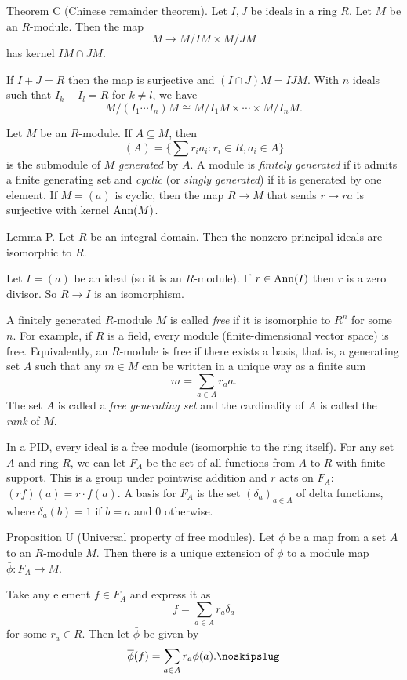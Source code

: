 \parenproclaim Theorem C (Chinese remainder theorem). Let $I,J$ be ideals in a ring $R$. Let $M$ be an $R$-module. Then the map
$$M\to M/IM \times M/JM$$
has kernel $IM\cap JM$.\slug

If $I+J = R$ then the map is surjective and $(I\cap J)M = IJM$. With $n$ ideals such that $I_k + I_l = R$ for $k\neq l$, we have
$$M/(I_1\cdots I_n)M \cong M/I_1M \times \cdots \times M/I_nM.$$

Let $M$ be an $R$-module. If $A\subseteq M$, then
$$(A) = \Big\{\sum r_ia_i : r_i\in R, a_i \in A\Big\}$$
is the submodule of $M$ {\it generated} by $A$. A module is {\it finitely generated} if it admits a finite generating set and {\it cyclic} (or {\it singly generated}) if it is generated by one element. If $M = (a)$ is cyclic, then the map $R\to M$ that sends $r\mapsto ra$ is surjective with kernel $\mathop {\rm Ann}(M)$.

\proclaim Lemma P. Let $R$ be an integral domain. Then the nonzero principal ideals are isomorphic to $R$.

\proof Let $I = (a)$ be an ideal (so it is an $R$-module). If $r\in \mathop {\rm Ann}(I)$ then $r$ is a zero divisor. So $R\to I$ is an isomorphism.\slug

A finitely generated $R$-module $M$ is called {\it free} if it is isomorphic to $R^n$ for some $n$. For example, if $R$ is a field, every module (finite-dimensional vector space) is free. Equivalently, an $R$-module is free if there exists a basis, that is, a generating set $A$ such that any $m\in M$ can be written in a unique way as a finite sum
$$m = \sum_{a\in A} r_a a.$$
The set $A$ is called a {\it free generating set} and the cardinality of $A$ is called the {\it rank} of $M$.

In a PID, every ideal is a free module (isomorphic to the ring itself). For any set $A$ and ring $R$, we can let $F_A$ be the set of all functions from $A$ to $R$ with finite support. This is a group under pointwise addition and $r$ acts on $F_A$: $(rf)(a) = r\cdot f(a)$. A basis for $F_A$ is the set $(\delta_a)_{a\in A}$ of delta functions, where $\delta_a(b) = 1$ if $b=a$ and $0$ otherwise.

\parenproclaim Proposition U (Universal property of free modules). Let $\phi$ be a map from a set $A$ to an $R$-module $M$. Then there is a unique extension of $\phi$ to a module map $\bar\phi : F_A\to M$.

\proof Take any element $f\in F_A$ and express it as
$$f = \sum_{a\in A} r_a\delta_a$$
for some $r_a\in R$. Then let $\bar\phi$ be given by
$$\bar\phi(f) = \sum_{a\in A} r_a\phi(a).\noskipslug$$


